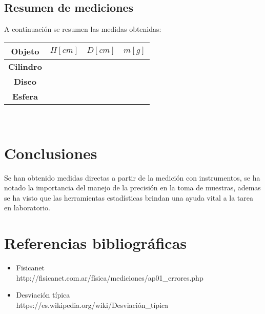 \documentclass[letter,11pt]{article}
\begin{document}
\subsection{Resumen de mediciones}
A continuación se resumen las medidas obtenidas:

\begin{center}
\begin{tabular}{|c|>{\centering}m{2.0cm}<{\centering}
                  |>{\centering}m{2.0cm}<{\centering}
                  |>{\centering}m{2.0cm}<{\centering}|}
\hline
\textbf{Objeto} & \textbf{$H[cm]$}
             & \textbf{$D[cm]$}
             & \textbf{$m[g]$} \tabularnewline \hline
\textbf{Cilindro} & & & \\ \hline
\textbf{Disco} & & & \\ \hline
\textbf{Esfera} & & & \\ \hline
\end{tabular}\\
\end{center}

\section{Conclusiones}
Se han obtenido medidas directas a partir de la medición con instrumentos, se
ha notado la importancia del manejo de la precisión en la toma de muestras,
ademas se ha visto que las herramientas estadísticas brindan una ayuda vital a
la tarea en laboratorio.

\section{Referencias bibliográficas}
\begin{itemize}
\item Fisicanet \\
http://fisicanet.com.ar/física/mediciones/ap01\_errores.php
\item Desviación típica \\
https://es.wikipedia.org/wiki/Desviación\_típica
\end{itemize}
\end{document}
